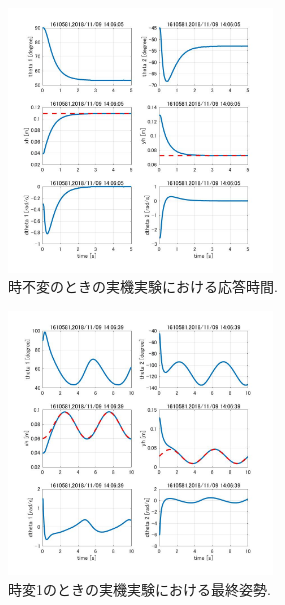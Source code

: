 \documentclass[twocolumn, 10pt,a4j]{jsarticle}
\begin{document}
\begin{enumerate}
        \begin{figure}[H]
          \begin{center}
            \includegraphics[width=7cm]{../img/kadai45/jpg_zissai_hand_zifuhen_auto_zikan.jpg}
            \caption{時不変のときの実機実験における応答時間.}
          \end{center}
        \end{figure}
        \begin{figure}[H]
          \begin{center}
            \includegraphics[width=7cm]{../img/kadai45/jpg_zissai_hand_zihen_saisyu_sise_1.jpg}
            \caption{時変1のときの実機実験における最終姿勢.}
          \end{center}
        \end{figure}
        

\end{enumerate}
\end{document}
